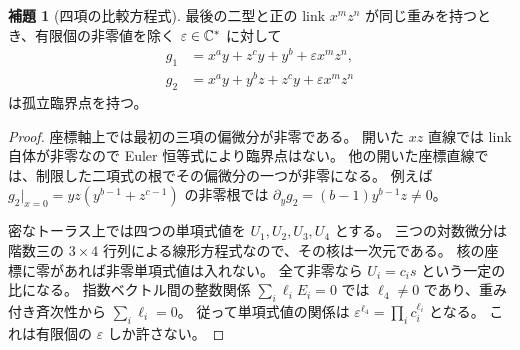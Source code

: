 \documentclass[11pt,a4paper]{ltjsarticle}
\numberwithin{equation}{section}
\theoremstyle{definition}
\newtheorem{lemma}[theorem]{補題}
\newcommand{\eps}{\varepsilon}\newcommand{\wt}{\operatorname{wt}}\newcommand{\ord}{\operatorname{ord}}
\begin{document}
\begin{lemma}[四項の比較方程式]\label{lem:fourterm}
最後の二型と正の link $x^m z^n$ が同じ重みを持つとき、有限個の非零値を除く $\eps\in\C^*$ に対して
\begin{align*}
 g_1&=x^ay+z^cy+y^b+\eps x^m z^n,\\
 g_2&=x^ay+y^bz+z^cy+\eps x^m z^n
\end{align*}
は孤立臨界点を持つ。
\end{lemma}
\begin{proof}
座標軸上では最初の三項の偏微分が非零である。
開いた $xz$ 直線では link 自体が非零なので Euler 恒等式により臨界点はない。
他の開いた座標直線では、制限した二項式の根でその偏微分の一つが非零になる。
例えば $g_2|_{x=0}=yz(y^{b-1}+z^{c-1})$ の非零根では
$\partial_y g_2=(b-1)y^{b-1}z\ne0$。

密なトーラス上では四つの単項式値を $U_1,U_2,U_3,U_4$ とする。
三つの対数微分は階数三の $3\times4$ 行列による線形方程式なので、その核は一次元である。
核の座標に零があれば非零単項式値は入れない。
全て非零なら $U_i=c_i s$ という一定の比になる。
指数ベクトル間の整数関係 $\sum_i\ell_i E_i=0$ では $\ell_4\ne0$ であり、重み付き斉次性から $\sum_i\ell_i=0$。
従って単項式値の関係は
$\eps^{\ell_4}=\prod_i c_i^{\ell_i}$ となる。
これは有限個の $\eps$ しか許さない。
\end{proof}
\end{document}
